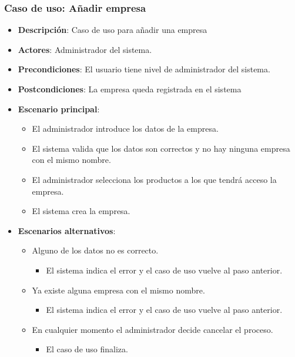 \documentclass[12pt,a4paperpaper,]{report}
\providecommand{\tightlist}{%
  \setlength{\itemsep}{0pt}\setlength{\parskip}{0pt}}
\begin{document}
\subsubsection{Caso de uso: Añadir
empresa}\label{caso-de-uso-auxf1adir-empresa}

\begin{itemize}
\tightlist
\item
  \textbf{Descripción}: Caso de uso para añadir una empresa
\item
  \textbf{Actores}: Administrador del sistema.
\item
  \textbf{Precondiciones}: El usuario tiene nivel de administrador del
  sistema.
\item
  \textbf{Postcondiciones}: La empresa queda registrada en el sistema
\item
  \textbf{Escenario principal}:

  \begin{itemize}
  \tightlist
  \item
    El administrador introduce los datos de la empresa.
  \item
    El sistema valida que los datos son correctos y no hay ninguna
    empresa con el mismo nombre.
  \item
    El administrador selecciona los productos a los que tendrá acceso la
    empresa.
  \item
    El sistema crea la empresa.
  \end{itemize}
\item
  \textbf{Escenarios alternativos}:

  \begin{itemize}
  \tightlist
  \item
    Alguno de los datos no es correcto.

    \begin{itemize}
    \tightlist
    \item
      El sistema indica el error y el caso de uso vuelve al paso
      anterior.
    \end{itemize}
  \item
    Ya existe alguna empresa con el mismo nombre.

    \begin{itemize}
    \tightlist
    \item
      El sistema indica el error y el caso de uso vuelve al paso
      anterior.
    \end{itemize}
  \item
    En cualquier momento el administrador decide cancelar el proceso.

    \begin{itemize}
    \tightlist
    \item
      El caso de uso finaliza.
    \end{itemize}
  \end{itemize}
\end{itemize}
\end{document}
